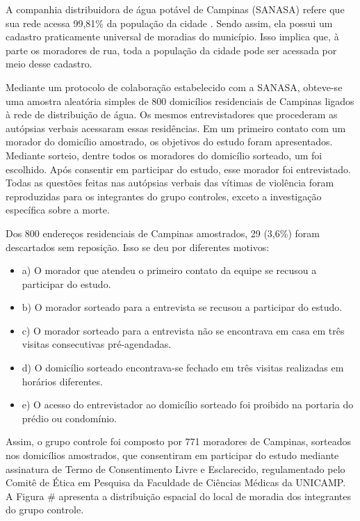 A companhia distribuidora de água potável de Campinas (SANASA) refere que sua rede acessa 99,81\% da população da cidade \citep{SANASA2020}. Sendo assim, ela possui um cadastro praticamente universal de moradias do município. Isso implica que, à parte os moradores de rua, toda a população da cidade pode ser acessada por meio desse cadastro.

Mediante um protocolo de colaboração estabelecido com a SANASA, obteve-se uma amostra aleatória simples de 800 domicílios residenciais de Campinas ligados à rede de distribuição de água. Os mesmos entrevistadores que procederam as autópsias verbais acessaram essas residências. Em um primeiro contato com um morador do domicílio amostrado, os objetivos do estudo foram apresentados. Mediante sorteio, dentre todos os moradores do domicílio sorteado, um foi escolhido. Após consentir em participar do estudo, esse morador foi entrevistado. Todas as questões feitas nas autópsias verbais das vítimas de violência foram reproduzidas para os integrantes do grupo controles, exceto a investigação específica sobre a morte.

Dos 800 endereços residenciais de Campinas amostrados, 29 (3,6\%) foram descartados sem reposição. Isso se deu por diferentes motivos:

\begin{itemize}
    \item a) O morador que atendeu o primeiro contato da equipe se recusou a participar do estudo.
    \item b) O morador sorteado para a entrevista se recusou a participar do estudo.
    \item c) O morador sorteado para a entrevista não se encontrava em casa em três visitas consecutivas pré-agendadas.
    \item d) O domicílio sorteado encontrava-se fechado em três visitas realizadas em horários diferentes.
    \item e) O acesso do entrevistador ao domicílio sorteado foi proibido na portaria do prédio ou condomínio.
\end{itemize}

Assim, o grupo controle foi composto por 771 moradores de Campinas, sorteados nos domicílios amostrados, que consentiram em participar do estudo mediante assinatura de Termo de Consentimento Livre e Esclarecido, regulamentado pelo Comitê de Ética em Pesquisa da Faculdade de Ciências Médicas da UNICAMP. A Figura \# apresenta a distribuição espacial do local de moradia dos integrantes do grupo controle.

